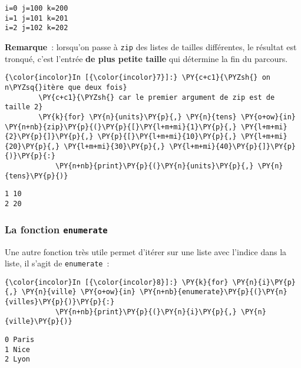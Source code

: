     \begin{Verbatim}[commandchars=\\\{\}]
i=0 j=100 k=200
i=1 j=101 k=201
i=2 j=102 k=202

    \end{Verbatim}

    \textbf{Remarque}~: lorsqu'on passe à \texttt{zip} des listes de tailles
différentes, le résultat est tronqué, c'est l'entrée \textbf{de plus
petite taille} qui détermine la fin du parcours.

    \begin{Verbatim}[commandchars=\\\{\}]
{\color{incolor}In [{\color{incolor}7}]:} \PY{c+c1}{\PYZsh{} on n\PYZsq{}itère que deux fois}
        \PY{c+c1}{\PYZsh{} car le premier argument de zip est de taille 2}
        \PY{k}{for} \PY{n}{units}\PY{p}{,} \PY{n}{tens} \PY{o+ow}{in} \PY{n+nb}{zip}\PY{p}{(}\PY{p}{[}\PY{l+m+mi}{1}\PY{p}{,} \PY{l+m+mi}{2}\PY{p}{]}\PY{p}{,} \PY{p}{[}\PY{l+m+mi}{10}\PY{p}{,} \PY{l+m+mi}{20}\PY{p}{,} \PY{l+m+mi}{30}\PY{p}{,} \PY{l+m+mi}{40}\PY{p}{]}\PY{p}{)}\PY{p}{:}
            \PY{n+nb}{print}\PY{p}{(}\PY{n}{units}\PY{p}{,} \PY{n}{tens}\PY{p}{)}
\end{Verbatim}


    \begin{Verbatim}[commandchars=\\\{\}]
1 10
2 20

    \end{Verbatim}

    \hypertarget{la-fonction-enumerate}{%
\subsubsection{\texorpdfstring{La fonction
\texttt{enumerate}}{La fonction enumerate}}\label{la-fonction-enumerate}}

    Une autre fonction très utile permet d'itérer sur une liste avec
l'indice dans la liste, il s'agit de \texttt{enumerate}~:

    \begin{Verbatim}[commandchars=\\\{\}]
{\color{incolor}In [{\color{incolor}8}]:} \PY{k}{for} \PY{n}{i}\PY{p}{,} \PY{n}{ville} \PY{o+ow}{in} \PY{n+nb}{enumerate}\PY{p}{(}\PY{n}{villes}\PY{p}{)}\PY{p}{:}
            \PY{n+nb}{print}\PY{p}{(}\PY{n}{i}\PY{p}{,} \PY{n}{ville}\PY{p}{)}
\end{Verbatim}


    \begin{Verbatim}[commandchars=\\\{\}]
0 Paris
1 Nice
2 Lyon

    \end{Verbatim}

